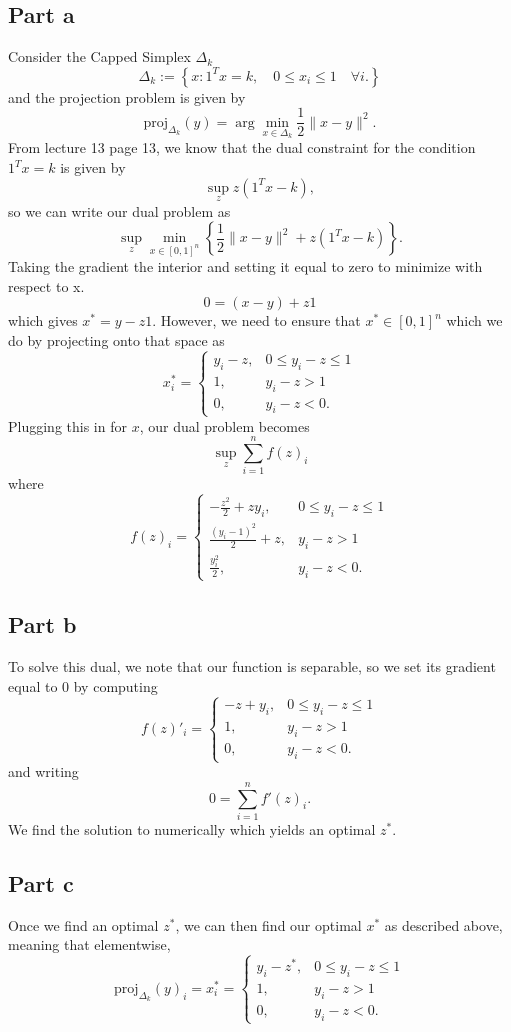 \documentclass{article}
\begin{document}
\subsection{Part a}
Consider the Capped Simplex $\Delta_k$
\[
\Delta_k := \left\{x: 1^Tx = k, \quad 0 \leq x_i \leq 1 \quad \forall i. \right\}
\]
and the projection problem is given by 
\[
\mbox{proj}_{\Delta_k}(y) = \arg\min_{x \in \Delta_k} \frac{1}{2}\|x-y\|^2.
\]
From lecture 13 page 13, we know that the dual constraint for the condition $1^Tx = k$ is given by 
\[
\sup_z z(1^Tx - k),
\]
so we can write our dual problem as 
\[
\sup_z\min_{x\in[0,1]^n}\left\{\frac{1}{2}\|x-y\|^2+z(1^Tx - k)\right\}.
\]
Taking the gradient the interior and setting it equal to zero to minimize with respect to x. 
\[
0=(x-y)+z1
\]
which gives $x^*=y-z1$. However, we need to ensure that $x^*\in[0,1]^n$ which we do by projecting onto that space as
\[
x^*_i=\begin{cases}
y_i-z, &0\leq y_i-z\leq1\\
1, &y_i-z>1\\
0, &y_i-z<0.
\end{cases}
\]
Plugging this in for $x$, our dual problem becomes
\[
\sup_z \sum_{i=1}^n f(z)_i
\]
where 
\[
f(z)_i=\begin{cases}
-\frac{z^2}{2}+zy_i, &0\leq y_i-z\leq1\\
\frac{(y_i-1)^2}{2}+z, &y_i-z>1\\
\frac{y_i^2}{2}, &y_i-z<0.
\end{cases}
\]

\subsection{Part b}
To solve this dual, we note that our function is separable, so we set its gradient equal to 0 by computing
\[
f(z)'_i=\begin{cases}
-z+y_i, &0\leq y_i-z\leq1\\
1, &y_i-z>1\\
0, &y_i-z<0.
\end{cases}
\]
and writing
\[
0=\sum_{i=1}^n f'(z)_i.
\]
We find the solution to numerically which yields an optimal $z^*$.

\subsection{Part c}
Once we find an optimal $z^*$, we can then find our optimal $x^*$ as described above, meaning that elementwise,
\[
\mbox{proj}_{\Delta_k}(y)_i=x^*_i=\begin{cases}
y_i-z^*, &0\leq y_i-z\leq1\\
1, &y_i-z>1\\
0, &y_i-z<0.
\end{cases}
\]
\end{document}
